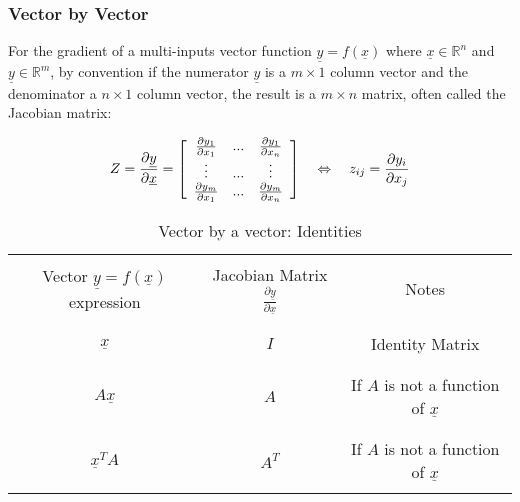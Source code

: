 \subsubsection{Vector by Vector}
For the gradient of a multi-inputs vector function $\underline{y} = f(\underline{x})$ where $\underline{x} \in \mathbb{R}^n$ and $\underline{y} \in \mathbb{R}^m$, by convention if the numerator $\underline{y}$ is a $m \times 1$ column vector and the denominator a $n \times 1$ column vector, the result is a $m \times n$ matrix, often called the Jacobian matrix:

\begin{align}
 Z = \frac{\partial \underline{y}}{\partial \underline{x}} =
 \left[ \begin{array}{c c c }
         \frac{\partial y_1}{\partial x_{1}}   & ... & \frac{\partial y_1}{\partial x_{n}} \\
         \vdots                             & ... & \vdots                          \\
         \frac{\partial y_m}{\partial x_{1}}   & ... & \frac{\partial y_m}{\partial x_{n}} \\
 \end{array} \right]
 \quad\Leftrightarrow\quad
 z_{ij} = \frac{\partial y_i}{\partial x_j}
\end{align}

\begin{table}[H]
 \centering
 \caption{ Vector by a vector: Identities}
 \label{scavec}
 \begin{tabular}{ | c | c | c |}
  \hline \hline & & \\
  Vector $\underline{y} = f(\underline{x})$ expression &Jacobian Matrix $\frac{\partial \underline{y}}{\partial \underline{x}}$  & Notes \\ & & \\
  \hline \hline & & \\
  $ \underline{x} $ &
  $I$ &   Identity Matrix
  \\ & & \\
  \hline & & \\
  $ A \underline{x} $ &
  $A$ &   If $A$ is not a function of $\underline{x}$
  \\ & & \\
  \hline & & \\
  $ \underline{x}^T A $ &
  $A^T$ &   If $A$ is not a function of $\underline{x}$
  \\ & & \\
  \hline
 \end{tabular}
\end{table}

